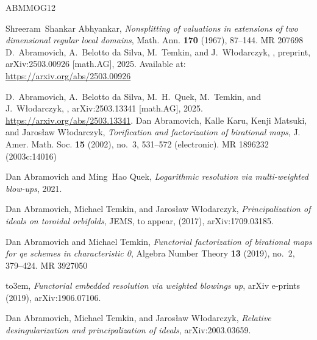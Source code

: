\documentclass{amsart}
\begin{document}
\providecommand{\bysame}{\leavevmode\hbox to3em{\hrulefill}\thinspace}
\providecommand{\MR}{\relax\ifhmode\unskip\space\fi MR }
\providecommand{\MRhref}[2]{%
  \href{http://www.ams.org/mathscinet-getitem?mr=#1}{#2}
}
\providecommand{\href}[2]{#2}
\begin{thebibliography}{ABMMOG12}

Shreeram~Shankar Abhyankar, \emph{Nonsplitting of valuations in extensions of
  two dimensional regular local domains}, Math. Ann. \textbf{170} (1967),
  87--144. \MR{207698}
D.~Abramovich, A.~Belotto da Silva, M.~Temkin, and J.~W{\l}odarczyk,
,
\newblock preprint, arXiv:2503.00926 [math.AG], 2025.
Available at: \url{https://arxiv.org/abs/2503.00926}

D.~Abramovich, A.~Belotto da Silva, M.~H.~Quek, M.~Temkin, and J.~W\l odarczyk,
,
\newblock arXiv:2503.13341 [math.AG], 2025. \url{https://arxiv.org/abs/2503.13341}.
Dan Abramovich, Kalle Karu, Kenji Matsuki, and Jaros{\l}aw W{\l}odarczyk,
  \emph{Torification and factorization of birational maps}, J. Amer. Math. Soc.
  \textbf{15} (2002), no.~3, 531--572 (electronic). \MR{1896232 (2003c:14016)}

Dan Abramovich and Ming~Hao Quek, \emph{Logarithmic resolution via
  multi-weighted blow-ups}, 2021.

Dan {Abramovich}, Michael {Temkin}, and Jaros{\l}aw {W{\l}odarczyk},
  \emph{{Principalization of ideals on toroidal orbifolds}}, JEMS, to appear,
  (2017), arXiv:1709.03185.

Dan Abramovich and Michael Temkin, \emph{Functorial factorization of birational
  maps for qe schemes in characteristic 0}, Algebra Number Theory \textbf{13}
  (2019), no.~2, 379--424. \MR{3927050}


\bysame, \emph{{Functorial embedded resolution via weighted blowings up}},
  arXiv e-prints (2019), arXiv:1906.07106.

Dan Abramovich, Michael Temkin, and Jaros{\l}aw W{\l}odarczyk, \emph{Relative
  desingularization and principalization of ideals}, arXiv:2003.03659.


\end{thebibliography}
\end{document}
